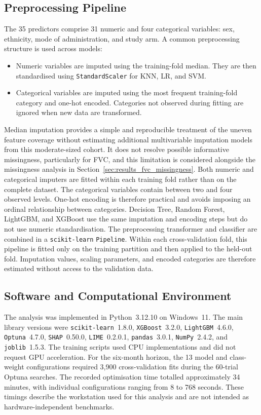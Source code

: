 \subsection{Preprocessing Pipeline}
\label{sec:methods_preprocessing}
The 35 predictors comprise 31 numeric and four categorical variables: sex, ethnicity, mode of administration, and study arm. A common preprocessing structure is used across models:
\begin{itemize}
  \item Numeric variables are imputed using the training-fold median. They are then standardised using \texttt{StandardScaler} for \gls{KNN}, \gls{LR}, and \gls{SVM}.
  \item Categorical variables are imputed using the most frequent training-fold category and one-hot encoded. Categories not observed during fitting are ignored when new data are transformed.
\end{itemize}
Median imputation provides a simple and reproducible treatment of the uneven feature coverage without estimating additional multivariable imputation models from this moderate-sized cohort. It does not resolve possible informative missingness, particularly for FVC, and this limitation is considered alongside the missingness analysis in Section~\ref{sec:results_fvc_missingness}. Both numeric and categorical imputers are fitted within each training fold rather than on the complete dataset.
The categorical variables contain between two and four observed levels. One-hot encoding is therefore practical and avoids imposing an ordinal relationship between categories. Decision Tree, Random Forest, LightGBM, and XGBoost use the same imputation and encoding steps but do not use numeric standardisation.
The preprocessing transformer and classifier are combined in a \texttt{scikit-learn} \texttt{Pipeline}. Within each cross-validation fold, this pipeline is fitted only on the training partition and then applied to the held-out fold. Imputation values, scaling parameters, and encoded categories are therefore estimated without access to the validation data.

\subsection{Software and Computational Environment}
\label{sec:methods_environment}
The analysis was implemented in Python~3.12.10 on Windows~11. The main library versions were \texttt{scikit-learn}~1.8.0, \texttt{XGBoost}~3.2.0, \texttt{LightGBM}~4.6.0, \texttt{Optuna}~4.7.0, \texttt{SHAP}~0.50.0, \texttt{LIME}~0.2.0.1, \texttt{pandas}~3.0.1, \texttt{NumPy}~2.4.2, and \texttt{joblib}~1.5.3. The training scripts used CPU implementations and did not request \gls{GPU} acceleration.
For the six-month horizon, the 13 model and class-weight configurations required 3,900 cross-validation fits during the 60-trial Optuna searches. The recorded optimisation time totalled approximately 34 minutes, with individual configurations ranging from 8 to 768 seconds. These timings describe the workstation used for this analysis and are not intended as hardware-independent benchmarks.

